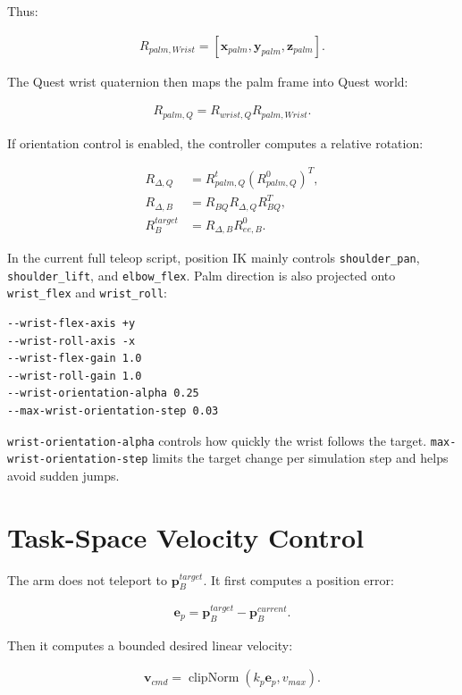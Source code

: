\documentclass[11pt]{article}
\begin{document}
Thus:

\begin{align}
R_{palm,Wrist}
  = [\mathbf{x}_{palm},\mathbf{y}_{palm},\mathbf{z}_{palm}] .
\end{align}

The Quest wrist quaternion then maps the palm frame into Quest world:

\begin{align}
R_{palm,Q} = R_{wrist,Q}R_{palm,Wrist}.
\end{align}

If orientation control is enabled, the controller computes a relative rotation:

\begin{align}
R_{\Delta,Q} &= R^{t}_{palm,Q}(R^{0}_{palm,Q})^T, \\
R_{\Delta,B} &= R_{BQ}R_{\Delta,Q}R_{BQ}^T, \\
R^{target}_{B} &= R_{\Delta,B}R^{0}_{ee,B}.
\end{align}

In the current full teleop script, position IK mainly controls
\texttt{shoulder\_pan}, \texttt{shoulder\_lift}, and \texttt{elbow\_flex}.
Palm direction is also projected onto \texttt{wrist\_flex} and
\texttt{wrist\_roll}:

\begin{lstlisting}
--wrist-flex-axis +y
--wrist-roll-axis -x
--wrist-flex-gain 1.0
--wrist-roll-gain 1.0
--wrist-orientation-alpha 0.25
--max-wrist-orientation-step 0.03
\end{lstlisting}

\texttt{wrist-orientation-alpha} controls how quickly the wrist follows the
target. \texttt{max-wrist-orientation-step} limits the target change per
simulation step and helps avoid sudden jumps.

\section{Task-Space Velocity Control}

The arm does not teleport to \(\mathbf{p}^{target}_{B}\). It first computes a
position error:

\begin{align}
\mathbf{e}_{p} = \mathbf{p}^{target}_{B} - \mathbf{p}^{current}_{B}.
\end{align}

Then it computes a bounded desired linear velocity:

\begin{align}
\mathbf{v}_{cmd}
  = \operatorname{clipNorm}(k_p\mathbf{e}_p, v_{max}).
\end{align}
\end{document}
